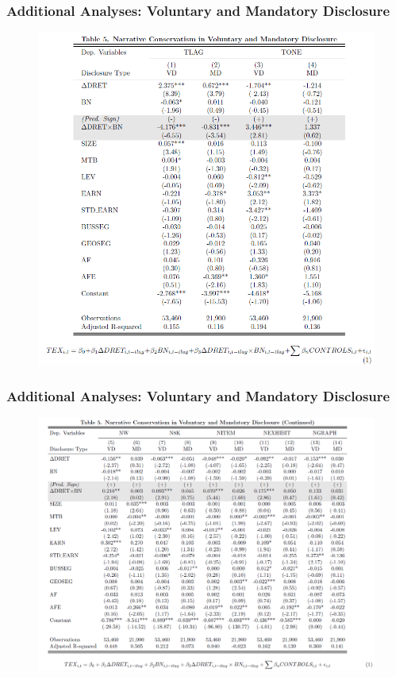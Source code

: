 \documentclass{beamer}
\begin{document}
\begin{frame}
\frametitle{Additional Analyses: Voluntary and Mandatory Disclosure}
	\begin{figure}[h]
	\centering
	\includegraphics[width=0.63\linewidth]{tab5}
	\label{tab5}
	\end{figure}
	
\end{frame}
\begin{frame}
	\frametitle{Additional Analyses: Voluntary and Mandatory Disclosure}
	\begin{figure}[h]
		\centering
		\includegraphics[width=0.8\linewidth]{tab5_cont}
		\label{tab5_cont}
	\end{figure}
	
\end{frame}
\end{document}
